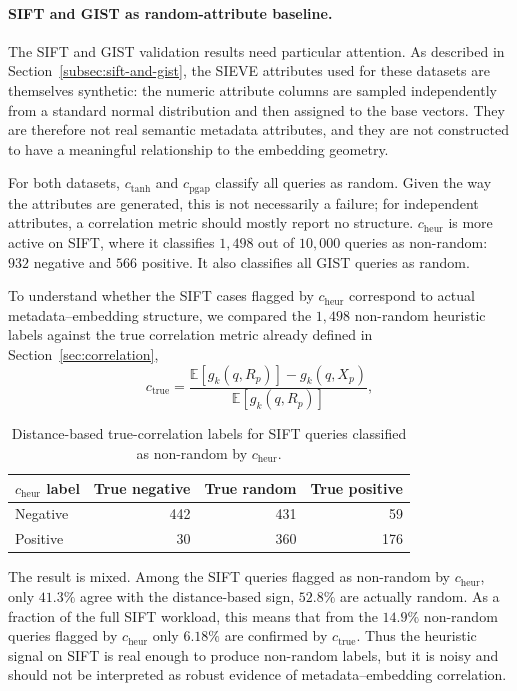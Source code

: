 \paragraph{SIFT and GIST as random-attribute baseline.}

The SIFT and GIST validation results need particular attention.
As described in Section~\ref{subsec:sift-and-gist}, the SIEVE attributes used for these datasets are themselves synthetic: the numeric attribute columns are sampled independently from a standard normal distribution and then assigned to the base vectors.
They are therefore not real semantic metadata attributes, and they are not constructed to have a meaningful relationship to the embedding geometry.

For both datasets, \(c_{\mathrm{tanh}}\) and \(c_{\mathrm{pgap}}\) classify all queries as random.
Given the way the attributes are generated, this is not necessarily a failure; for independent attributes, a correlation metric should mostly report no structure.
\(c_{\mathrm{heur}}\) is more active on SIFT, where it classifies \(1{,}498\) out of \(10{,}000\) queries as non-random: \(932\) negative and \(566\) positive.
It also classifies all GIST queries as random.

To understand whether the SIFT cases flagged by \(c_{\mathrm{heur}}\) correspond to actual metadata--embedding structure, 
we compared the \(1{,}498\) non-random heuristic labels against the true correlation metric already defined in Section~\ref{sec:correlation},
\[
    c_{\mathrm{true}}
    =
    \frac{\mathbb{E}[g_k(q,R_p)] - g_k(q,X_p)}
         {\mathbb{E}[g_k(q,R_p)]},
\]

\begin{table}[H]
    \centering
    \renewcommand{\arraystretch}{1.12}
    \begin{tabular}{lrrr}
        \toprule
        \(c_{\mathrm{heur}}\) label & True negative & True random & True positive \\
        \midrule
        Negative & 442 & 431 & 59 \\
        Positive & 30 & 360 & 176 \\
        \bottomrule
    \end{tabular}
    \caption{Distance-based true-correlation labels for SIFT queries classified as non-random by \(c_{\mathrm{heur}}\).}
    \label{tab:sift-heuristic-true-correlation}
\end{table}

The result is mixed.
Among the SIFT queries flagged as non-random by \(c_{\mathrm{heur}}\), only \(41.3\%\) agree with the distance-based sign, \(52.8\%\) are actually random.
As a fraction of the full SIFT workload, this means that from the \(14.9\%\) non-random queries flagged by \(c_{\mathrm{heur}}\) only \(6.18\%\) are confirmed by \(c_{\mathrm{true}}\).
Thus the heuristic signal on SIFT is real enough to produce non-random labels, but it is noisy and should not be interpreted as robust evidence of metadata--embedding correlation.

